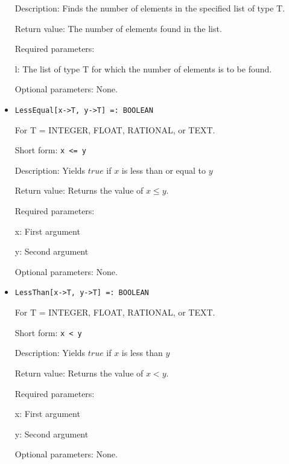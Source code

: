 \begin{itemize}
\bd
\item
[Description:] Finds the number of elements in the specified list of
type T.
\item
[Return value:] The number of elements found in the list.
\item
[Required parameters:]\hfil\null

\bd
\item
[l:] The list of type T for which the number of elements is to be
found.
\ed

\item
[Optional parameters:] None.
\ed

\item
\protect \large \begin{verbatim}
LessEqual[x->T, y->T] =: BOOLEAN
\end{verbatim}\normalsize

For T = INTEGER, FLOAT, RATIONAL, or TEXT.

\bd
\item
[Short form:] \verb+x <= y+
\item
[Description:] Yields $true$ if $x$ is less than or equal to $y$
\item
[Return value:] Returns the value of $x \leq y$.
\item
[Required parameters:]\hfil\null

\bd
\item
[x:] First argument
\item
[y:] Second argument
\ed

\item
[Optional parameters:] None.
\ed

\item
\protect \large \begin{verbatim}
LessThan[x->T, y->T] =: BOOLEAN
\end{verbatim}\normalsize

For T = INTEGER, FLOAT, RATIONAL, or TEXT.

\bd
\item
[Short form:] \verb+x < y+
\item
[Description:] Yields $true$ if $x$ is less than $y$
\item
[Return value:] Returns the value of $x < y$.
\item
[Required parameters:]\hfil\null

\bd
\item
[x:] First argument
\item
[y:] Second argument
\ed
\item
[Optional parameters:] None.
\ed


\end{itemize}
